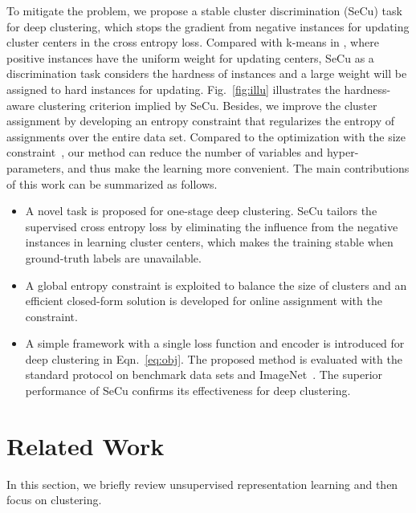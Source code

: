 \documentclass[10pt,twocolumn,letterpaper]{article}
\begin{document}
To mitigate the problem, we propose a stable cluster discrimination (SeCu) task for deep clustering, which stops the gradient from negative instances for updating cluster centers in the cross entropy loss. Compared with k-means in \cite{coke}, where positive instances have the uniform weight for updating centers, SeCu as a discrimination task considers the hardness of instances and a large weight will be assigned to hard instances for updating. Fig.~\ref{fig:illu} illustrates the hardness-aware clustering criterion implied by SeCu. Besides, we improve the cluster assignment by developing an entropy constraint that regularizes the entropy of assignments over the entire data set. Compared to the optimization with the size constraint~\cite{coke}, our method can reduce the number of variables and hyper-parameters, and thus make the learning more convenient. The main contributions of this work can be summarized as follows.
\begin{itemize}
    \item A novel task is proposed for one-stage deep clustering. SeCu tailors the supervised cross entropy loss by eliminating the influence from the negative instances in learning cluster centers, which makes the training stable when ground-truth labels are unavailable.
    \item A global entropy constraint is exploited to balance the size of clusters and an efficient closed-form solution is developed for online assignment with the constraint. 
    \item A simple framework with a single loss function and encoder is introduced for deep clustering in Eqn.~\ref{eq:obj}. The proposed method is evaluated with the standard protocol on benchmark data sets and ImageNet~\cite{RussakovskyDSKS15}. The superior performance of SeCu confirms its effectiveness for deep clustering.
\end{itemize}

\section{Related Work}
In this section, we briefly review unsupervised representation learning and then focus on clustering.
\end{document}
